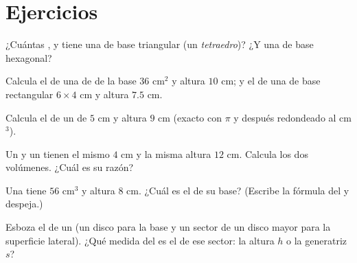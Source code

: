 \section{Ejercicios}

\begin{exercise}[$\star$]\label{exo:g8:solids:1}
¿Cuántas ,  y  tiene una  de base
triangular (un \emph{tetraedro})? ¿Y una de base hexagonal?
\end{exercise}

\begin{exercise}[$\star$]\label{exo:g8:solids:2}
Calcula el  de una  de  de la base $36$ cm$^2$ y
altura $10$ cm; y el de una  de base rectangular
$6 \times 4$ cm y altura $7.5$ cm.
\end{exercise}

\begin{exercise}[$\star$]\label{exo:g8:solids:3}
Calcula el  de un  de  $5$ cm y altura $9$ cm
(exacto con $\pi$ y después redondeado al cm$^3$).
\end{exercise}

\begin{exercise}[$\star$]\label{exo:g8:solids:4}
Un  y un  tienen el mismo  $4$ cm y la misma altura
$12$ cm. Calcula los dos volúmenes. ¿Cuál es su razón?
\end{exercise}

\begin{exercise}[$\star$]\label{exo:g8:solids:5}
Una  tiene  $56$ cm$^3$ y altura $8$ cm. ¿Cuál es el 
de su base? (Escribe la fórmula del  y despeja.)
\end{exercise}

\begin{exercise}[$\star$]\label{exo:g8:solids:6}
Esboza el  de un  (un disco para la base y un sector de un
disco mayor para la superficie lateral). ¿Qué medida del 
es el  de ese sector: la altura $h$ o la generatriz
$s$?
\end{exercise}

